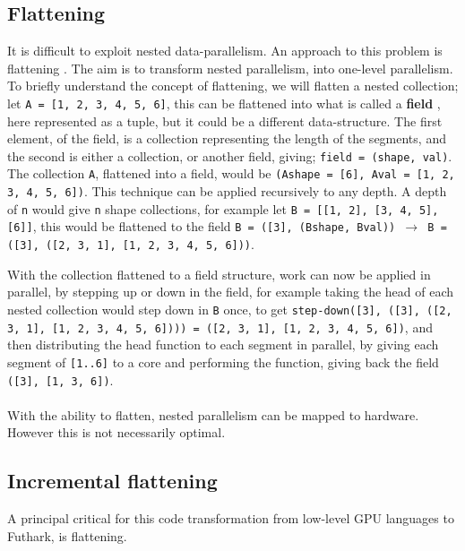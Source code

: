 \subsection{Flattening}
It is difficult to exploit nested data-parallelism. An approach to this problem is flattening \cite{flat}. The aim is to transform nested parallelism, into one-level parallelism. To briefly understand the concept of flattening, we will flatten a nested collection; let \texttt{A = [1, 2, 3, 4, 5, 6]}, this can be flattened into what is called a \textbf{field} \cite{flat}, here represented as a tuple, but it could be a different data-structure. The first element, of the field, is a collection representing the length of the segments, and the second is either a collection, or another field, giving; \texttt{field = (shape, val)}. The collection \texttt{A}, flattened into a field, would be \texttt{(Ashape = [6], Aval = [1, 2, 3, 4, 5, 6])}. This technique can be applied recursively to any depth. A depth of \texttt{n} would give \texttt{n} shape collections, for example let \texttt{B = [[1, 2], [3, 4, 5], [6]]}, this would be flattened to the field \texttt{B = ([3], (Bshape, Bval)) $\to$ B = ([3], ([2, 3, 1], [1, 2, 3, 4, 5, 6]))}. 

With the collection flattened to a field structure, work can now be applied in parallel, by stepping up or down in the field, for example taking the head of each nested collection would step down in \texttt{B} once, to get \texttt{step-down([3], ([3], ([2, 3, 1], [1, 2, 3, 4, 5, 6]))) = ([2, 3, 1], [1, 2, 3, 4, 5, 6])}, and then distributing the head function to each segment in parallel, by giving each segment of \texttt{[1..6]} to a core and performing the function, giving back the field \texttt{([3], [1, 3, 6])}.\\\\
With the ability to flatten, nested parallelism can be mapped to hardware. However this is not necessarily optimal.   

\subsection{Incremental flattening}
A principal critical for this code transformation from low-level GPU languages to Futhark, is flattening. 


